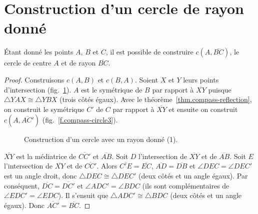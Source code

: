 


\section{Construction d'un cercle de rayon donné}\label{s.circle}

\begin{theorem}\label{thm.compass-radius}
Étant donné les points $A$, $B$ et $C$, il est possible de construire $c(A,\overline{BC})$, le cercle de centre $A$ et de rayon $\overline{BC}$.
\end{theorem}

\begin{proof}
Construisons $c(A,B)$ et $c(B,A)$. Soient $X$ et $Y$  leurs points d'intersection (fig.~\ref{f.compass-circle1}). $A$ est le symétrique de $B$ par rapport à $\overline{XY}$ puisque $\triangle YAX\cong \triangle YBX$ (trois côtés égaux). Avec le théorème~\ref{thm.compass-reflection}, on construit le symétrique $C'$ de $C$ par rapport à $\overline{XY}$ et ensuite on construit $c(A,\overline{AC'})$ (fig.~\ref{f.compass-circle3}).

\begin{figure}[htbp]
\centering
{}
\caption{Construction d'un cercle avec un rayon donné (1).}\label{f.compass-circle1}
\end{figure}

$\overline{XY}$ est la médiatrice de $\overline{CC'}$ et $\overline{AB}$. Soit $D$ l'intersection de $\overline{XY}$ et de $\overline{AB}$. Soit $E$ l'intersection de $\overline{XY}$ et de $\overline{CC'}$. Alors $\overline{C'E}=\overline{EC}$, $\overline{AD}=\overline{DB}$ et $\angle DEC=\angle DEC'$ est un angle droit, donc $\triangle DEC\cong\triangle DEC'$ (deux côtés et un angle égaux). Par conséquent, $\overline{DC}=\overline{DC'}$ et $\angle ADC'=\angle BDC$ (ils sont complémentaires de $\angle EDC'=\angle EDC$). Il s'ensuit que $\triangle ADC'\cong\triangle BDC$ (deux côtés et un angle égaux).  Donc $\overline{AC'}=\overline{BC}$.
\end{proof}

